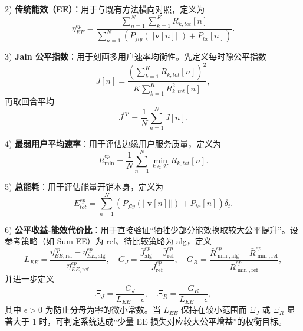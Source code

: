 \documentclass[journal,onecolumn]{IEEEtran}
\begin{document}
	2) \textbf{传统能效（EE）}：用于与既有方法横向对照，定义为
	\begin{equation}
		\eta_{EE}^{ep}=\frac{\sum_{n=1}^{N}\sum_{k=1}^{K}R_{k,tot}[n]}{\sum_{n=1}^{N}\left(P_{fly}(||\mathbf{v}[n]||)+P_{tx}[n]\right)}.
		\label{eq:metric_ee}
	\end{equation}
	
	3) \textbf{Jain 公平指数}：用于刻画多用户速率均衡性。先定义每时隙公平指数
	\begin{equation}
		J[n]=\frac{\left(\sum_{k=1}^{K}R_{k,tot}[n]\right)^2}{K\sum_{k=1}^{K}R_{k,tot}^2[n]},
		\label{eq:metric_jain_slot}
	\end{equation}
	再取回合平均
	\begin{equation}
		\bar{J}^{ep}=\frac{1}{N}\sum_{n=1}^{N}J[n].
		\label{eq:metric_jain_ep}
	\end{equation}
	
	4) \textbf{最弱用户平均速率}：用于评估边缘用户服务质量，定义为
	\begin{equation}
		\bar{R}_{\min}^{ep}=\frac{1}{N}\sum_{n=1}^{N}\min_{k\in\mathcal{K}}R_{k,tot}[n].
		\label{eq:metric_rmin}
	\end{equation}
	
	5) \textbf{总能耗}：用于评估能量开销本身，定义为
	\begin{equation}
		E_{tot}^{ep}=\sum_{n=1}^{N}\left(P_{fly}(||\mathbf{v}[n]||)+P_{tx}[n]\right)\delta_t.
		\label{eq:metric_etot}
	\end{equation}

	6) \textbf{公平收益-能效代价比}：用于直接验证“牺牲少部分能效换取较大公平提升”。设参考策略（如 Sum-EE）为 ref、待比较策略为 alg，定义
	\begin{equation}
		L_{EE}=\frac{\eta_{EE,\mathrm{ref}}^{ep}-\eta_{EE,\mathrm{alg}}^{ep}}{\eta_{EE,\mathrm{ref}}^{ep}},\quad
		G_J=\frac{\bar{J}_{\mathrm{alg}}^{ep}-\bar{J}_{\mathrm{ref}}^{ep}}{\bar{J}_{\mathrm{ref}}^{ep}},\quad
		G_{R}=\frac{\bar{R}_{\min,\mathrm{alg}}^{ep}-\bar{R}_{\min,\mathrm{ref}}^{ep}}{\bar{R}_{\min,\mathrm{ref}}^{ep}},
		\label{eq:metric_tradeoff_gain_loss}
	\end{equation}
	并进一步定义
	\begin{equation}
		\Xi_J=\frac{G_J}{L_{EE}+\epsilon},\quad \Xi_R=\frac{G_R}{L_{EE}+\epsilon},
		\label{eq:metric_tradeoff_ratio}
	\end{equation}
	其中 $\epsilon>0$ 为防止分母为零的微小常数。当 $L_{EE}$ 保持在较小范围而 $\Xi_J$ 或 $\Xi_R$ 显著大于 1 时，可判定系统达成“少量 EE 损失对应较大公平增益”的权衡目标。
	
\end{document}
